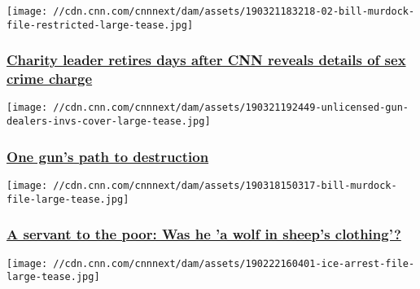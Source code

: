 \href{/2019/03/22/us/bill-murdock-eblen-charities-invs/index.html}{}

\texttt{[image: //cdn.cnn.com/cnnnext/dam/assets/190321183218-02-bill-murdock-file-restricted-large-tease.jpg]}

\hypertarget{charity-leader-retires-days-after-cnn-reveals-details-of-sex-crime-charge}{%
\subsubsection{\texorpdfstring{\href{/2019/03/22/us/bill-murdock-eblen-charities-invs/index.html}{Charity
leader retires days after CNN reveals details of sex crime
charge}}{Charity leader retires days after CNN reveals details of sex crime charge}}\label{charity-leader-retires-days-after-cnn-reveals-details-of-sex-crime-charge}}

\href{https://www.cnn.com/interactive/2019/03/us/unlicensed-gun-dealers-invs/index.html}{}

\texttt{[image: //cdn.cnn.com/cnnnext/dam/assets/190321192449-unlicensed-gun-dealers-invs-cover-large-tease.jpg]}

\hypertarget{one-guns-path-to-destruction-1}{%
\subsubsection{\texorpdfstring{\href{https://www.cnn.com/interactive/2019/03/us/unlicensed-gun-dealers-invs/index.html}{One
gun's path to
destruction}}{One gun's path to destruction}}\label{one-guns-path-to-destruction-1}}

\href{/2019/03/19/us/ebelen-charity-bill-murdock-invs/index.html}{}

\texttt{[image: //cdn.cnn.com/cnnnext/dam/assets/190318150317-bill-murdock-file-large-tease.jpg]}

\hypertarget{a-servant-to-the-poor-was-he-a-wolf-in-sheeps-clothing}{%
\subsubsection{\texorpdfstring{\href{/2019/03/19/us/ebelen-charity-bill-murdock-invs/index.html}{A
servant to the poor: Was he 'a wolf in sheep's
clothing'?}}{A servant to the poor: Was he 'a wolf in sheep's clothing'?}}\label{a-servant-to-the-poor-was-he-a-wolf-in-sheeps-clothing}}

\href{/2019/03/13/us/ice-supervisors-dont-always-review-deportation-warrants-invs/index.html}{}

\texttt{[image: //cdn.cnn.com/cnnnext/dam/assets/190222160401-ice-arrest-file-large-tease.jpg]}

